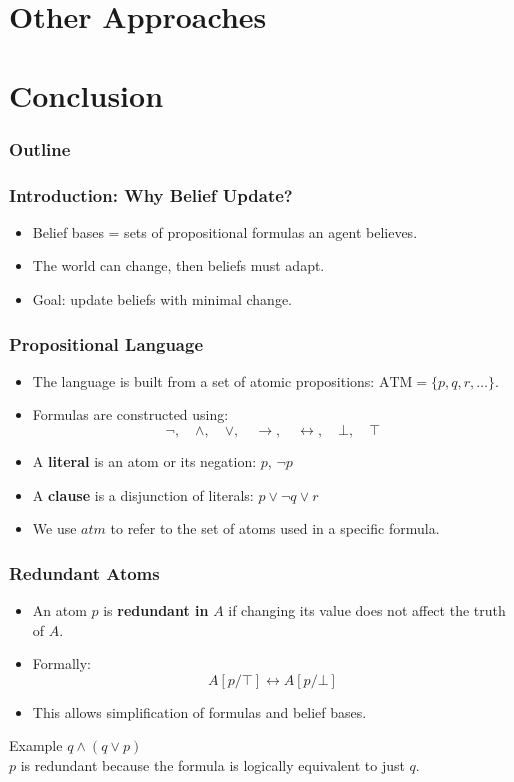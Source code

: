 \documentclass{beamer}
\begin{document}
\section{Other Approaches}

\section{Conclusion}

\begin{frame}
\frametitle{Outline}
\small
\tableofcontents
\end{frame}


\begin{frame}
\frametitle{Introduction: Why Belief Update?}
\begin{itemize}
    \item Belief bases = sets of propositional formulas an agent believes.
    \item The world can change, then beliefs must adapt.
    \item Goal: update beliefs with minimal change.
\end{itemize}
\end{frame}


\begin{frame}
\frametitle{Propositional Language}
\begin{itemize}
    \item The language is built from a set of atomic propositions: $\text{ATM} = \{p, q, r, \ldots\}$.
    \item Formulas are constructed using:
    \[
        \neg, \quad \wedge, \quad \vee, \quad \rightarrow, \quad \leftrightarrow, \quad \bot, \quad \top
    \]
    \item A \textbf{literal} is an atom or its negation: $p$, $\neg p$
    \item A \textbf{clause} is a disjunction of literals: $p \vee \neg q \vee r$
    \item We use $\mathit{atm}$ to refer to the set of atoms used in a specific formula.
\end{itemize}
\end{frame}

\begin{frame}
\frametitle{Redundant Atoms}
\begin{itemize}
    \item An atom $p$ is \textbf{redundant in} $A$ if changing its value does not affect the truth of $A$.
    \item Formally:
    \[
    A[p / \top] \leftrightarrow A[p / \bot]
    \]
    \item This allows simplification of formulas and belief bases.
\end{itemize}
\pause
\begin{block}{Example}
$q \wedge (q \vee p)$ \\
$p$ is redundant because the formula is logically equivalent to just $q$.
\end{block}
\end{frame}
\end{document}

